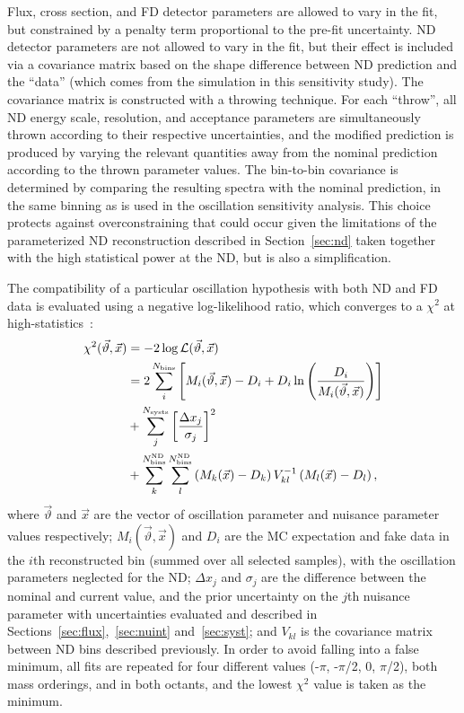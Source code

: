 Flux, cross section, and FD detector parameters are allowed to vary in the fit, but constrained by a penalty term proportional to the pre-fit uncertainty. ND detector parameters are not allowed to vary in the fit, but their effect is included via a covariance matrix based on the shape difference between ND prediction and the ``data'' (which comes from the simulation in this sensitivity study). The covariance matrix is constructed with a throwing technique. For each ``throw'', all ND energy scale, resolution, and acceptance parameters are simultaneously thrown according to their respective uncertainties, and the modified prediction is produced by varying the relevant quantities away from the nominal prediction according to the thrown parameter values. The bin-to-bin covariance is determined by comparing the resulting spectra with the nominal prediction, in the same binning as is used in the oscillation sensitivity analysis. This choice protects against overconstraining that could occur given the limitations of the parameterized ND reconstruction described in Section~\ref{sec:nd} taken together with the high statistical power at the ND, but is also a simplification.

The compatibility of a particular oscillation hypothesis with both ND and FD data is evaluated using a negative log-likelihood ratio, which converges to a $\chi^{2}$ at high-statistics~\cite{Tanabashi:2018oca}:
\begin{equation}
\begin{aligned}
  \chi^2(\vec{\vartheta}, \vec{x}) &= -2\log\mathcal{L}(\vec{\vartheta}, \vec{x}) \\
  &= 2\sum_i^{N_{\rm bins}}\left[ M_i(\vec{\vartheta}, \vec{x})-D_i+D_i\ln\left({D_i\over M_i(\vec{\vartheta}, \vec{x})}\right) \right] \\
  &+ \sum_{j}^{N_{\mathrm{systs}}}\left[ \frac{\Delta x_{j}}{\sigma_{j}} \right]^{2} \\
  &+ \sum^{N^{\mathrm{ND}}_{\mathrm{bins}}}_{k}\sum^{N^{\mathrm{ND}}_{\mathrm{bins}}}_{l} \left(M_k(\vec{x})-D_k \right) V^{-1}_{kl}\left(M_l(\vec{x})-D_l \right),
\end{aligned}
\label{eq:chisq}
\end{equation}
where $\vec{\vartheta}$ and $\vec{x}$ are the vector of oscillation parameter and nuisance parameter values respectively; $M_i(\vec{\vartheta}, \vec{x})$ and $D_{i}$ are the MC expectation and fake data in the $i$th reconstructed bin (summed over all selected samples), with the oscillation parameters neglected for the ND; $\Delta x_{j}$ and $\sigma_{j}$ are the difference between the nominal and current value, and the prior uncertainty on the $j$th nuisance parameter with uncertainties evaluated and described in Sections~\ref{sec:flux},~\ref{sec:nuint} and~\ref{sec:syst}; and $V_{kl}$ is the covariance matrix between ND bins described previously. In order to avoid falling into a false minimum, all fits are repeated for four different \deltacp values (-$\pi$, -$\pi$/2, 0, $\pi$/2), both mass orderings, and in both octants, and the lowest $\chi^{2}$ value is taken as the minimum.

